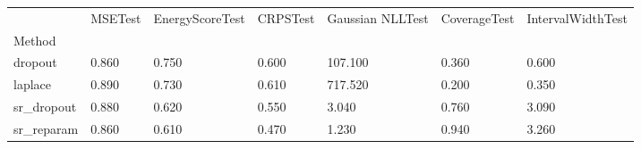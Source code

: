 \begin{tabular}{lllllll}
\toprule
 & MSETest & EnergyScoreTest & CRPSTest & Gaussian NLLTest & CoverageTest & IntervalWidthTest \\
Method &  &  &  &  &  &  \\
\midrule
dropout & 0.860 & 0.750 & 0.600 & 107.100 & 0.360 & 0.600 \\
laplace & 0.890 & 0.730 & 0.610 & 717.520 & 0.200 & 0.350 \\
sr_dropout & 0.880 & 0.620 & 0.550 & 3.040 & 0.760 & 3.090 \\
sr_reparam & 0.860 & 0.610 & 0.470 & 1.230 & 0.940 & 3.260 \\
\bottomrule
\end{tabular}
